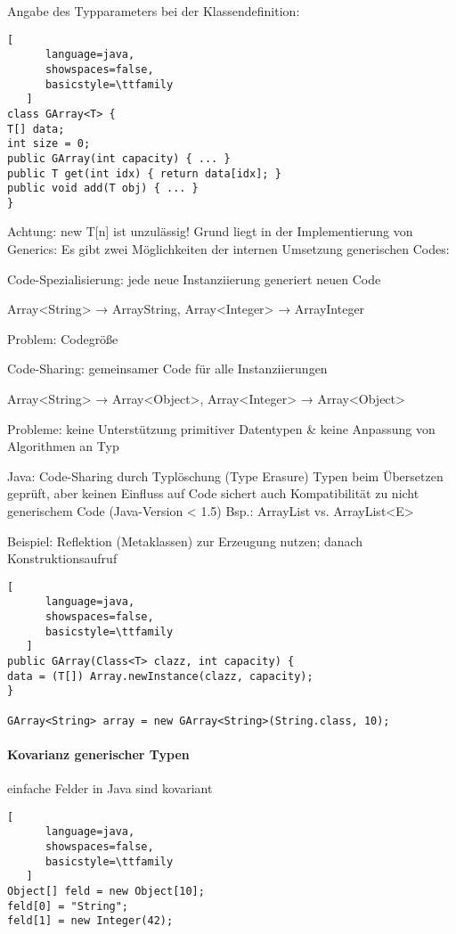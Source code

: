 \documentclass[10pt]{article}
\begin{document}
\begin{itemize*}
Angabe des Typparameters bei der Klassendefinition:
\begin{lstlisting}[
      language=java,
      showspaces=false,
      basicstyle=\ttfamily
   ]
class GArray<T> {
T[] data;
int size = 0;
public GArray(int capacity) { ... }
public T get(int idx) { return data[idx]; }
public void add(T obj) { ... }
}
\end{lstlisting}

Achtung: new T[n] ist unzulässig! Grund liegt in der Implementierung von Generics:
Es gibt zwei Möglichkeiten der internen Umsetzung generischen Codes:
\begin{itemize*}
  \item Code-Spezialisierung: jede neue Instanziierung generiert neuen Code
  \begin{itemize*}
    \item Array<String> → ArrayString, Array<Integer> → ArrayInteger
    \item Problem: Codegröße
  \end{itemize*}
  \item Code-Sharing: gemeinsamer Code für alle Instanziierungen
  \begin{itemize*}
    \item Array<String> → Array<Object>, Array<Integer> → Array<Object>
    \item Probleme: keine Unterstützung primitiver Datentypen \& keine Anpassung von Algorithmen an Typ
  \end{itemize*}
\end{itemize*}
Java: Code-Sharing durch Typlöschung (Type Erasure)
Typen beim Übersetzen geprüft, aber keinen Einfluss auf Code
sichert auch Kompatibilität zu nicht generischem Code (Java-Version < 1.5) Bsp.: ArrayList vs. ArrayList<E>

Beispiel: Reflektion (Metaklassen) zur Erzeugung nutzen; danach Konstruktionsaufruf
\begin{lstlisting}[
      language=java,
      showspaces=false,
      basicstyle=\ttfamily
   ]
public GArray(Class<T> clazz, int capacity) {
data = (T[]) Array.newInstance(clazz, capacity);
}

GArray<String> array = new GArray<String>(String.class, 10);
\end{lstlisting}


\paragraph{Kovarianz generischer Typen}
einfache Felder in Java sind kovariant
\begin{lstlisting}[
      language=java,
      showspaces=false,
      basicstyle=\ttfamily
   ]
Object[] feld = new Object[10];
feld[0] = "String";
feld[1] = new Integer(42);
\end{lstlisting}


\end{itemize*}
\end{document}
